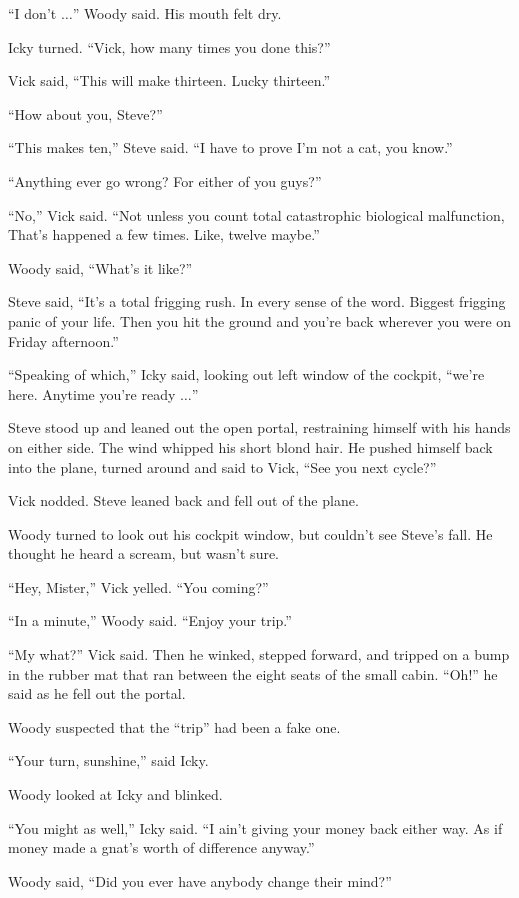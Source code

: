 ``I don't $\ldots$'' Woody said. His mouth felt dry.

Icky turned. ``Vick, how many times you done this?''

Vick said, ``This will make thirteen. Lucky thirteen.''

``How about you, Steve?''

``This makes ten,'' Steve said. ``I have to prove I'm not a cat, you know.''

``Anything ever go wrong? For either of you guys?''

``No,'' Vick said. ``Not unless you count total catastrophic biological malfunction, That's happened a few times. Like, twelve maybe.''

Woody said, ``What's it like?''

Steve said, ``It's a total frigging rush. In every sense of the word. Biggest frigging panic of your life. Then you hit the ground and you're back wherever you were on Friday afternoon.''

``Speaking of which,'' Icky said, looking out left window of the cockpit, ``we're here. Anytime you're ready $\ldots$''

Steve stood up and leaned out the open portal, restraining himself with his hands on either side. The wind whipped his short blond hair. He pushed himself back into the plane, turned around and said to Vick, ``See you next cycle?''

Vick nodded. Steve leaned back and fell out of the plane.

Woody turned to look out his cockpit window, but couldn't see Steve's fall. He thought he heard a scream, but wasn't sure.

``Hey, Mister,'' Vick yelled. ``You coming?''

``In a minute,'' Woody said. ``Enjoy your trip.''

``My what?'' Vick said. Then he winked, stepped forward, and tripped on a bump in the rubber mat that ran between the eight seats of the small cabin. ``Oh!'' he said as he fell out the portal.

Woody suspected that the ``trip'' had been a fake one.

``Your turn, sunshine,'' said Icky.

Woody looked at Icky and blinked.

``You might as well,'' Icky said. ``I ain't giving your money back either way. As if money made a gnat's worth of difference anyway.''

Woody said, ``Did you ever have anybody change their mind?''

